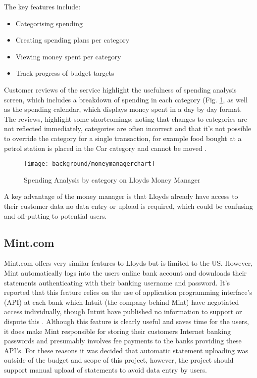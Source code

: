 The key features include:
\begin{itemize}
\item Categorising spending
\item Creating spending plans per category
\item Viewing money spent per category
\item Track progress of budget targets
\end{itemize}

Customer reviews of the service highlight the usefulness of spending analysis screen, which includes a breakdown of spending in each \gls{category} (Fig. \ref{fig:moneymanager}, as well as the spending calendar, which displays money spent in a day by day format.
%
The reviews, highlight some shortcomings; noting that changes to categories are not reflected immediately, categories are often incorrect and that it's not possible to override the \gls{category} for a single transaction, for example food bought at a petrol station is placed in the Car \gls{category} and cannot be moved \cite{moneywatch2011lloyds, moneysupermarket2011lloyds}.

\begin{figure}[h]
    \centering
    \texttt{[image: background/moneymanagerchart]}
    \caption[Spending Analysis by category on Lloyds Money Manager]{Spending Analysis by category on Lloyds Money Manager \parencite{lloyds2014money}}
    \label{fig:moneymanager}
\end{figure}

A key advantage of the money manager is that Lloyds already have access to their customer data no data entry or upload is required, which could be confusing and off-putting to potential users.

\subsection{Mint.com}
Mint.com offers very similar features to Lloyds but is limited to the US. However, Mint automatically logs into the users online bank account and downloads their statements authenticating with their banking username and password. It's reported that this feature relies on the use of application programming interface's (API) at each bank which Intuit (the company behind Mint) have negotiated access individually, though Intuit have published no information to support or dispute this \cite{stackoverflow2012bankingapi, stackoverflow2012bankingapi2}.
% 
Although this feature is clearly useful and saves time for the users, it does make Mint responsible for storing their customers Internet banking passwords and presumably involves fee payments to the banks providing these API's.
%
For these reasons it was decided that automatic statement uploading was outside of the budget and scope of this project, however, the project should support manual upload of statements to avoid data entry by users.

